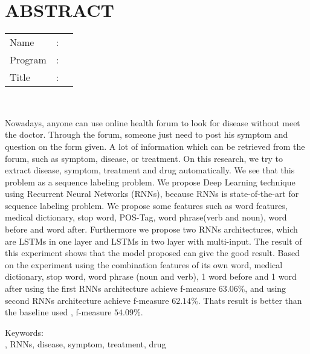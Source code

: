 %
%
%

\chapter*{ABSTRACT}

\vspace*{0.2cm}

\noindent \begin{tabular}{l l p{11.0cm}}
	Name&: & \penulis \\
	Program&: & \programEng \\
	Title&: & \judulInggris \\
\end{tabular} \\ 

\vspace*{0.5cm}

\noindent 

Nowadays, anyone can use online health forum to look for disease without meet the doctor. Through the forum, someone just need to post his symptom and question on the form given. A lot of information which can be retrieved from the forum, such as symptom, disease, or treatment. On this research, we try to extract disease, symptom, treatment and drug automatically. We see that this problem as a sequence labeling problem. We propose Deep Learning technique using Recurrent Neural Networks (RNNs), because RNNs is state-of-the-art for sequence labeling problem. We propose some features such as word features, medical dictionary, stop word, POS-Tag, word phrase(verb and noun), word before and word after. Furthermore we propose two RNNs architectures, which are LSTMs in one layer and LSTMs in two layer with multi-input. The result of this experiment shows that the model proposed can give the good result. Based on the experiment using the combination features of its own word, medical dictionary, stop word, word phrase (noun and verb), 1 word before and 1 word after using the first RNNs architecture achieve f-measure $ 63.06\% $, and using second RNNs architecture achieve f-measure $ 62.14\% $. Thats result is better than the baseline used \citep{skripsiKakRadit}, f-measure $ 54.09\% $.


\vspace*{0.2cm}

\noindent Keywords: \\ 
\noindent \mer, RNNs, disease, symptom, treatment, drug \\ 

\newpage